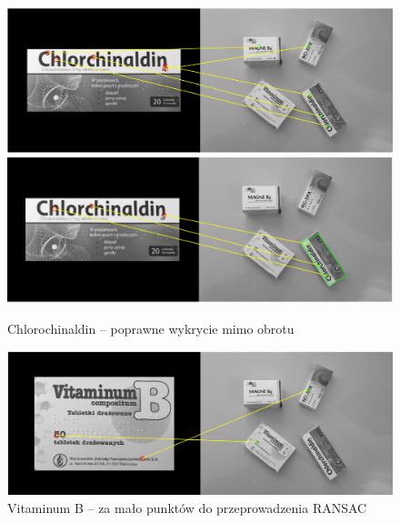 \documentclass[a4paper, 12pt, titlepage]{article}
\begin{document}
        \begin{figure}[H]
            \centering
            \includegraphics[width=0.8\linewidth]{third/first_3.png}
            \includegraphics[width=0.8\linewidth]{third/second_3.png}
            \caption{Chlorochinaldin -- poprawne wykrycie mimo obrotu}
        \end{figure}
        \begin{figure}[H]
            \centering
            \includegraphics[width=0.8\linewidth]{third/first_4.png}
            \caption{Vitaminum B -- za mało punktów do przeprowadzenia RANSAC}
        \end{figure}
        
\end{document}

